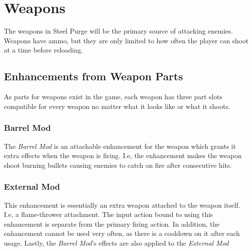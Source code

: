 \documentclass[../Main.tex]{subfiles}
\begin{document}
\section{Weapons}

The weapons in Steel Purge will be the primary source of attacking enemies. Weapons have ammo, but they are only limited to how often the player can shoot at a time before reloading.

\subsection{Enhancements from Weapon Parts}

As parts for weapons exist in the game, each weapon has three part slots compatible for every weapon no matter what it looks like or what it shoots.

\subsubsection{Barrel Mod}

The \emph{Barrel Mod} is an attachable enhancement for the weapon which grants it extra effects when the weapon is firing. I.e, the enhancement makes the weapon shoot burning bullets causing enemies to catch on fire after consecutive hits. 

\subsubsection{External Mod}

This enhancement is essentially an extra weapon attached to the weapon itself. I.e, a flame-thrower attachment. The input action bound to using this enhancement is separate from the primary firing action. In addition, the enhancement cannot be used very often, as there is a cooldown on it after each usage. Lastly, the \emph{Barrel Mod}'s effects are also applied to the \emph{External Mod}
\end{document}
